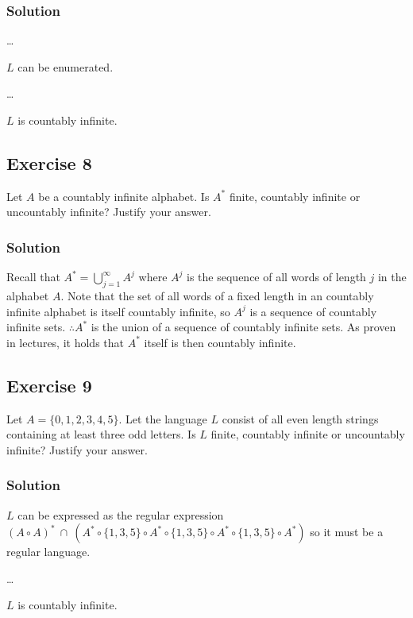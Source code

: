 \documentclass[12pt]{article}
\begin{document}
\subsubsection*{Solution}

\ldots

$L$ can be enumerated.

\dots

$L$ is countably infinite.

\subsection*{Exercise 8}

Let $A$ be a countably infinite alphabet.
Is $A^{*}$ finite, countably infinite or uncountably infinite? Justify your answer.

\subsubsection*{Solution}

Recall that $A^{*} = \bigcup\limits_{j=1}^{\infty} A^{j}$ where $A^{j}$ is the sequence of all words of length $j$ in the alphabet $A$.
Note that the set of all words of a fixed length in an countably infinite alphabet is itself countably infinite, so $A^{j}$ is a sequence of countably infinite sets.
$\therefore A^{*}$ is the union of a sequence of countably infinite sets. As proven in lectures, it holds that $A^{*}$ itself is then countably infinite.

\subsection*{Exercise 9}

Let $A = \{ 0, 1, 2, 3, 4, 5 \}$. Let the language $L$ consist of all even length strings containing at least three odd letters.
Is $L$ finite, countably infinite or uncountably infinite? Justify your answer.

\subsubsection*{Solution}

$L$ can be expressed as the regular expression ${(A \circ A)}^{*}\ \cap\ (A^{*} \circ \{1,3,5\} \circ A^{*} \circ \{1,3,5\} \circ A^{*} \circ \{1,3,5\} \circ A^{*})$
so it must be a regular language.

\ldots

$L$ is countably infinite.
\end{document}
